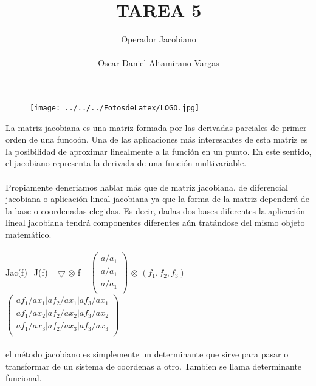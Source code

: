 \documentclass[12pt]{article}
\title{TAREA 5}
\author{Operador Jacobiano \\ \\ Oscar Daniel Altamirano Vargas\\}
\begin{document}
 
\maketitle
\begin{figure}[hbtp]
\centering
\texttt{[image: ../../../FotosdeLatex/LOGO.jpg]}
\end{figure}
\pagebreak
La matriz jacobiana es una matriz formada por las derivadas parciales de primer orden de una funcoón. Una de las aplicaciones más interesantes de esta matriz es la posibilidad de aproximar linealmente a la función en un punto. En este sentido, el jacobiano representa la derivada de una función multivariable.\cite{slideshare2012} \\ \\

Propiamente deneriamos hablar más que de matriz jacobiana, de diferencial jacobiana o aplicación lineal jacobiana ya que la forma de la matriz dependerá de la base o coordenadas elegidas. Es decir, dadas dos bases diferentes la aplicación lineal jacobiana tendrá componentes diferentes aún tratándose del mismo objeto matemático.\\ \\

Jac(f)=J(f)= $ \bigtriangledown $ $ \otimes $ f= $
\begin{pmatrix}
a/a_1 \\
a/a_1 \\
a/a_1 \\
\end{pmatrix}
$
$ \otimes $
$ (f_1,f_2,f_3)= $
$
\begin{pmatrix}
af_1/ax_1 | af_2/ax_1 | af_3/ax_1\\
af_1/ax_2 | af_2/ax_2 | af_3/ax_2\\
af_1/ax_3 | af_2/ax_3 | af_3/ax_3\\
\end{pmatrix}
$
\\ \\

el método jacobiano es simplemente un determinante que sirve para pasar o transformar de un sistema de coordenas a otro. Tambien se llama determinante funcional.
\pagebreak
\nocite{*} 


\end{document}
